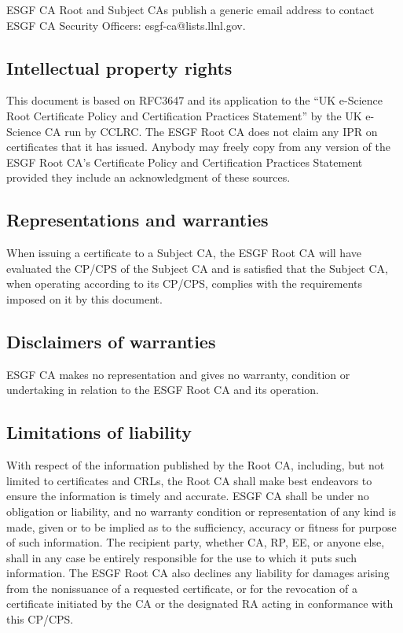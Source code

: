 ESGF CA Root and Subject CAs publish a generic email address to contact
ESGF CA Security Officers: esgf-ca@lists.llnl.gov.

\subsection{Intellectual property rights}\label{intellectual-property-rights}

This document is based on RFC3647 and its application to the ``UK
e-Science Root Certificate Policy and Certification Practices
Statement'' by the UK e-Science CA run by CCLRC. The ESGF Root CA does not claim any IPR on certificates that it has issued. Anybody may
freely copy from any version of the ESGF Root CA's Certificate
Policy and Certification Practices Statement provided they include an
acknowledgment of these sources.

\subsection{Representations and warranties}\label{representations-and-warranties}

When issuing a certificate to a Subject CA, the ESGF Root CA will
have evaluated the CP/CPS of the Subject CA and is satisfied that the
Subject CA, when operating according to its CP/CPS, complies with the
requirements imposed on it by this document.

\subsection{Disclaimers of warranties}\label{disclaimers-of-warranties}

ESGF CA makes no representation and gives no warranty, condition or
undertaking in relation to the ESGF Root CA and its operation.

\subsection{Limitations of liability}\label{limitations-of-liability}

With respect of the information published by the Root CA, including, but
not limited to certificates and CRLs, the Root CA shall make best
endeavors to ensure the information is timely and accurate. ESGF CA
shall be under no obligation or liability, and no warranty condition or
representation of any kind is made, given or to be implied as to the
sufficiency, accuracy or fitness for purpose of such information. The
recipient party, whether CA, RP, EE, or anyone else, shall in any case
be entirely responsible for the use to which it puts such information.
The ESGF Root CA also declines any liability for damages arising
from the nonissuance of a requested certificate, or for the revocation
of a certificate initiated by the CA or the designated RA acting in
conformance with this CP/CPS.

